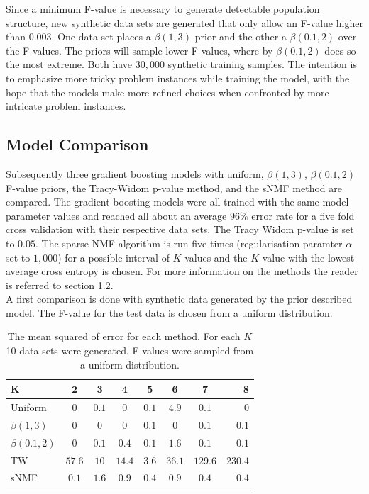 \documentclass[a4paper, 11pt]{article}
\begin{document}
Since a minimum F-value is necessary to generate detectable population structure, new synthetic data sets are generated that only allow an F-value higher than $0.003$. One data set places a $\beta(1, 3)$ prior and the other a $\beta(0.1, 2)$ over the F-values. The priors will sample lower F-values, where by $\beta(0.1, 2)$ does so the most extreme. Both have $30,000$ synthetic training samples. The intention is to emphasize more tricky problem instances while training the model, with the hope that the models make more refined choices when confronted by more intricate problem instances.
\\
\subsection{Model Comparison}
Subsequently three gradient boosting models with uniform, $\beta(1,3)$, $\beta(0.1,2)$ F-value priors, the Tracy-Widom p-value method, and the sNMF method are compared. The gradient boosting models were all trained with the same model parameter values and reached all about an average $96\%$ error rate for a five fold cross validation with their respective data sets. The Tracy Widom p-value is set to $0.05$. The sparse NMF algorithm is run five times (regularisation paramter $\alpha$ set to $1,000$) for a possible interval of $K$ values and the $K$ value with the lowest average cross entropy is chosen. For more information on the methods the reader is referred to section 1.2.\\
A first comparison is done with synthetic data generated by the prior described model. The F-value for the test data is chosen from a uniform distribution.
\begin{table}[h!]
  \begin{center}
    \label{tab:table4}
    \begin{tabular}{l|c|c|c|c|c|c|r} %
      \textbf{K} & $\mathbf{2}$ & $\mathbf{3}$ & $\mathbf{4}$ & $\mathbf{5}$ & $\mathbf{6}$ & $\mathbf{7}$ & $\mathbf{8}$\\
      \hline
      Uniform & $0$ & $0.1$ & $0$ & $0.1$ & $4.9$ & $0.1$ & $0$\\
      \hline
      $\beta(1,3)$ & $0$ & $0$ & $0$ & $0.1$ & $0$ &$0.1$ & $0.1$\\
      \hline
      $\beta(0.1,2)$& $0$ & $0.1$ & $0.4$ & $0.1$ & $1.6$ & $0.1$ & $0.1$\\
      \hline
      TW & $57.6$ & $10$ & $14.4$ & $3.6$ & $36.1$ & $129.6$ & $230.4$\\
      \hline
      sNMF & $0.1$ & $1.6$ & $0.9$ & $0.4$ & $0.9$ &$0.4$ & $0.4$\\
    \end{tabular}
    \caption{The mean squared of error for each method. For each $K$ 10 data sets were generated. F-values were sampled from a uniform distribution.}
  \end{center}
\end{table}
\end{document}
